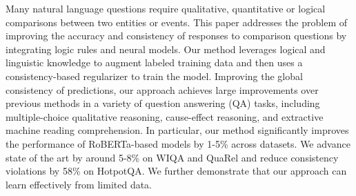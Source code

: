 Many natural language questions require qualitative, quantitative or logical comparisons between two entities or events. This paper addresses the problem of improving the accuracy and consistency of responses to comparison questions by integrating logic rules and neural models. Our method leverages logical and linguistic knowledge to augment labeled training data and then uses a consistency-based regularizer to train the model. Improving the global consistency of predictions, our approach achieves large improvements over previous methods in a variety of question answering (QA) tasks, including multiple-choice qualitative reasoning, cause-effect reasoning, and extractive machine reading comprehension. In particular, our method significantly improves the performance of RoBERTa-based models by 1-5\% across datasets. We advance state of the art by around 5-8\% on WIQA and QuaRel and reduce consistency violations by 58\% on HotpotQA. We further demonstrate that our approach can learn effectively from limited data.
